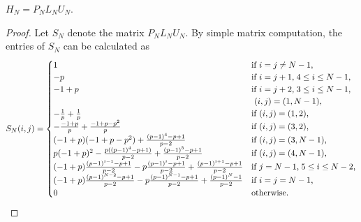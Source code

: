 \documentclass[10pt,a4paper]{amsart}
\begin{document}
\begin{thm}\label{decomposition2}
$H_N=P_NL_NU_N$.
\end{thm}

\begin{proof}

Let $S_N$ denote the matrix $P_NL_NU_N$.
By simple matrix computation, the entries of $S_N$ can be calculated as 
\[
S_N(i,j)=\begin{cases}
1 &\text{if $i=j\neq N-1$,}\\
-p &\text{if $i=j+1$,\;$4\leq i\leq N-1$,}\\
-1+p &\text{if $i=j+2$,\;$3\leq i\leq N-1$,}\\
 &\text{   $(i,j)=(1,N-1)$,}\\
-\frac{1}{p}+\frac{1}{p} &\text{if $(i,j)=(1,2)$,}\\
-\frac{-1+p}{p}+\frac{-1+p-p^2}{p} &\text{if $(i,j)=(3,2)$,}\\
(-1+p)(-1+p-p^2)+\frac{(p-1)^4-p+1}{p-2} &\text{if $(i,j)=(3,N-1)$,}\\
p(-1+p)^2-\frac{p((p-1)^4-p+1)}{p-2}+\frac{(p-1)^5-p+1}{p-2} &\text{if $(i,j)=(4,N-1)$,}\\
(-1+p)\frac{(p-1)^{i-1}-p+1}{p-2}-p\frac{(p-1)^i-p+1}{p-2}+\frac{(p-1)^{i+1}-p+1}{p-2}  &\text{if $j=N-1$,\;$5\leq i\leq N-2$,}\\
(-1+p)\frac{(p-1)^{N-2}-p+1}{p-2}-p\frac{(p-1)^{N-1}-p+1}{p-2}+\frac{(p-1)^N-1}{p-2} &\text{if $i=j=N-1$,}\\
0 &\text{otherwise.}\\
\end{cases}
\]


\end{proof}
\end{document}
